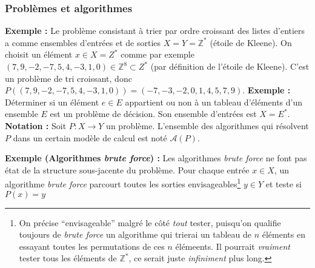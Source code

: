 \documentclass[../../../main.tex]{subfiles}
\begin{document}
\subsubsection{Problèmes et algorithmes}
\textbf{Exemple :} Le problème consistant à trier par ordre croissant des listes d'entiers a comme ensembles d'entrées et de sorties $X = Y = \mathbb{Z}^*$ (étoile de Kleene).\newline
On choisit un élément $x\in X = Z^*$ comme par exemple $(7, 9, -2, -7, 5, 4, -3, 1, 0)\in\mathbb{Z}^8\subset{Z^*}$ (par définition de l'étoile de Kleene).\newline
C'est un problème de tri croissant, donc $P((7, 9, -2, -7, 5, 4, -3, 1, 0)) = (-7, -3, -2, 0, 1, 4, 5, 7, 9)$.
\textbf{Exemple :} Déterminer si un élément $e\in E$ appartient ou non à un tableau d'éléments d'un ensemble $E$ est un problème de décision. Son ensemble d'entrées est $X = E^*$.
\textbf{Notation :} Soit $P:X\rightarrow Y$ un problème. L'ensemble des algorithmes qui résolvent $P$ dans un certain modèle de calcul est noté $\mathcal{A}(P)$.

\textbf{Exemple (Algorithmes \textit{brute force}) :} Les algorithmes \textit{brute force} ne font pas état de la structure sous-jacente du problème. Pour chaque entrée $x\in X$, un algorithme \textit{brute force} parcourt toutes les sorties envisageables\footnote{On précise ``envisageable'' malgré le côté \textit{tout} tester, puisqu'on qualifie toujours de \textit{brute force} un algorithme qui trierai un tableau de $n$ éléments en essayant toutes les permutations de ces $n$ élémeents. Il pourrait \textit{vraiment} tester tous les éléments de $\mathbb{Z}^*$, ce serait juste \textit{infiniment} plus long.} $y\in Y$ et teste si $P(x) = y$
\end{document}
